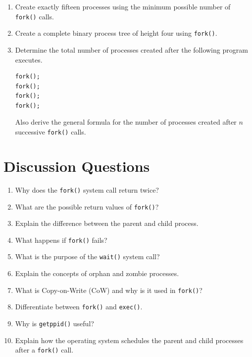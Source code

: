 \documentclass[12pt,a4paper]{article}
\begin{document}
\begin{enumerate}[resume]
\item Create exactly fifteen processes using the minimum possible number of \texttt{fork()} calls.

\item Create a complete binary process tree of height four using \texttt{fork()}.

\item Determine the total number of processes created after the following program executes.

\begin{lstlisting}
fork();
fork();
fork();
fork();
\end{lstlisting}

Also derive the general formula for the number of processes created after \(n\) successive \texttt{fork()} calls.

\end{enumerate}


\section*{Discussion Questions}

\begin{enumerate}

\item Why does the \texttt{fork()} system call return twice?

\item What are the possible return values of \texttt{fork()}?

\item Explain the difference between the parent and child process.

\item What happens if \texttt{fork()} fails?

\item What is the purpose of the \texttt{wait()} system call?

\item Explain the concepts of orphan and zombie processes.

\item What is Copy-on-Write (CoW) and why is it used in \texttt{fork()}?

\item Differentiate between \texttt{fork()} and \texttt{exec()}.

\item Why is \texttt{getppid()} useful?

\item Explain how the operating system schedules the parent and child processes after a \texttt{fork()} call.

\end{enumerate}
\end{document}
